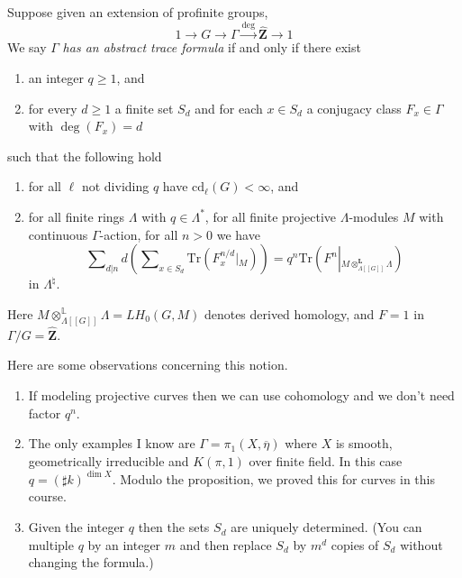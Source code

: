 \noindent
Suppose given an extension of profinite groups,
$$
1 \to G \to \Gamma \xrightarrow{\deg} \widehat{\mathbf{Z}} \to 1
$$
We say $\Gamma$ {\it has an abstract trace formula} if and only if
there exist
\begin{enumerate}
\item an integer $q\geq 1$, and
\item for every $d\geq 1$ a finite set $S_d$ and for each $x\in S_d$ a 
conjugacy class $F_x \in \Gamma$ with $\deg(F_x) = d$
\end{enumerate}
such that the following hold
\begin{enumerate}
\item for all $\ell$ not dividing $q$ have $\text{cd}_\ell(G)<\infty$, and
\item for all finite rings $\Lambda$ with $q\in \Lambda^*$,
for all finite projective $\Lambda$-modules $M$ with continuous
$\Gamma$-action, for all $n>0$ we have
$$
\sum\nolimits_{d|n}d \left(
\sum\nolimits_{x \in S_d}
\text{Tr}( F_x^{n/d} \left|_M\right.)
\right)
= 
q^n \text{Tr}( F^n\left|_{M\otimes_{\Lambda[[G]]}^{\mathbf{L}}\Lambda}\right.)
$$
in $\Lambda^\natural$.
\end{enumerate}
Here $M\otimes_{\Lambda[[G]]}^{\mathbb L}\Lambda = LH_0(G, M)$ denotes
derived homology, and $F=1$ in $\Gamma/G = \widehat{\mathbf{Z}}$.
	
\begin{remark}
\label{remark-abstract-trace-formula}
Here are some observations concerning this notion.
\begin{enumerate}
\item If modeling projective curves then we can use cohomology and we 
don't need factor $q^n$. 
\item The only examples I know are $\Gamma=\pi_1(X, \overline \eta)$ 
where $X$ is smooth, geometrically irreducible and $K(\pi, 1)$ over finite 
field. In this case $q=(\sharp k)^{\dim X}$. Modulo the proposition, we proved 
this for curves in this course.
\item Given the integer $q$ then the sets $S_d$ are uniquely 
determined. (You can multiple $q$ by an integer $m$ and then replace $S_d$ by 
$m^d$ copies of $S_d$ without changing the formula.) 
\end{enumerate}
\end{remark}
	
